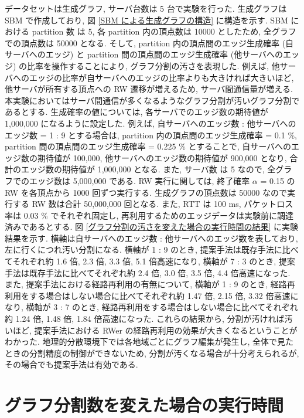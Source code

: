 データセットは生成グラフ, サーバ台数は 5 台で実験を行った. 生成グラフは SBM で作成しており, 図 \ref{SBM による生成グラフの構造} に構造を示す. SBM における partition 数 は 5, 各 partition 内の頂点数は 10000 としたため, 全グラフでの頂点数は 50000 となる. そして, partition 内の頂点間のエッジ生成確率 (自サーバへのエッジ) と partition 間の頂点間のエッジ生成確率 (他サーバへのエッジ) の比率を操作することにより, グラフ分割の汚さを表現した. 例えば, 他サーバへのエッジの比率が自サーバへのエッジの比率よりも大きければ大きいほど, 他サーバが所有する頂点への RW 遷移が増えるため, サーバ間通信量が増える.  本実験においてはサーバ間通信が多くなるようなグラフ分割が汚いグラフ分割であるとする. 生成確率の値については, 各サーバでのエッジ数の期待値が 1,000,000 になるように設定した. 例えば, 自サーバへのエッジ数 : 他サーバへのエッジ数 = 1 : 9 とする場合は, partition 内の頂点間のエッジ生成確率 = 0.1 \%, partition 間の頂点間のエッジ生成確率 = 0.225 \% とすることで, 自サーバへのエッジ数の期待値が 100,000, 他サーバへのエッジ数の期待値が 900,000 となり, 合計のエッジ数の期待値が 1,000,000 となる. また, サーバ数 は 5 なので, 全グラフでのエッジ数は 5,000,000 である. RW 実行に関しては, 終了確率 $\alpha$ = 0.15 の RW を各頂点から 1000 回ずつ実行する. 生成グラフの頂点数は 50000 なので実行する RW 数は合計 50,000,000 回となる. また, RTT は 100 ms, パケットロス率は 0.03 \% でそれぞれ固定し, 再利用するためのエッジデータは実験前に調達済みであるとする. 図 \ref{グラフ分割の汚さを変えた場合の実行時間の結果} に実験結果を示す. 横軸は自サーバへのエッジ数 : 他サーバへのエッジ数を表しており, 左に行くにつれ汚い分割になる. 横軸が 1 : 9 のとき, 提案手法は既存手法に比べてそれぞれ約 1.6 倍, 2.3 倍, 3.3 倍, 5.1 倍高速になり, 横軸が 7 : 3 のとき, 提案手法は既存手法に比べてそれぞれ約 2.4 倍, 3.0 倍, 3.5 倍, 4.4 倍高速になった. また, 提案手法における経路再利用の有無について, 横軸が 1 : 9 のとき, 経路再利用をする場合はしない場合に比べてそれぞれ約 1.47 倍, 2.15 倍, 3.32 倍高速になり, 横軸が 3 : 7 のとき, 経路再利用をする場合はしない場合に比べてそれぞれ約 1.24 倍, 1.48 倍, 1.84 倍高速になった. これらの結果から, 分割が汚ければ汚いほど, 提案手法における RWer の経路再利用の効果が大きくなるということがわかった. 地理的分散環境下では各地域ごとにグラフ編集が発生し, 全体で見たときの分割精度の制御ができないため, 分割が汚くなる場合が十分考えられるが, その場合でも提案手法は有効である. 

\section{グラフ分割数を変えた場合の実行時間}\label{グラフ分割数を変えた場合の実行時間}

